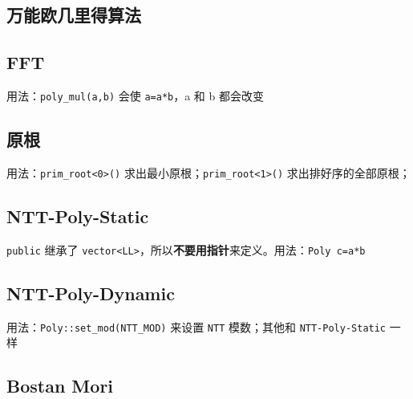 \documentclass[12pt]{article}
\theoremstyle{definition}
\theoremstyle{remark}
\begin{document}
\newpage

\subsection{万能欧几里得算法}



\newpage

\subsection{FFT}

用法：\texttt{poly\_{}mul(a,b)} 会使 \texttt{a=a*b}，a 和 b 都会改变



\newpage

\subsection{原根}

用法：\texttt{prim\_{}root<0>()} 求出最小原根；\texttt{prim\_{}root<1>()} 求出排好序的全部原根；



\newpage

\subsection{NTT-Poly-Static}

\texttt{public} 继承了 \texttt{vector<LL>}，所以\textbf{不要用指针}来定义。用法：\texttt{Poly c=a*b}



\newpage

\subsection{NTT-Poly-Dynamic}

用法：\texttt{Poly::set\_{}mod(NTT\_{}MOD)} 来设置 \texttt{NTT} 模数；其他和 \texttt{NTT-Poly-Static} 一样



\newpage

\subsection{Bostan Mori}
\end{document}
